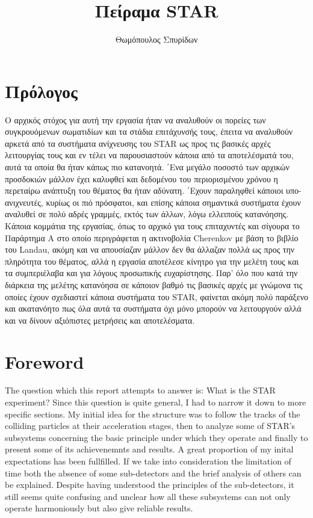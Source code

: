 \documentclass[a4paper,11pt]{book}
\title{Πείραμα 	STAR}
\author{Θωμόπουλος Σπυρίδων}
\begin{document}


\begin{changemargin}{2cm}{2cm} 
	\section*{Πρόλογος}
Ο αρχικός στόχος για αυτή την εργασία ήταν να αναλυθούν οι πορείες
των συγκρουόμενων σωματιδίων και τα στάδια επιτάχυνσής τους, έπειτα
να αναλυθούν αρκετά από τα συστήματα ανίχνευσης του STAR ως προς
τις βασικές αρχές λειτουργίας τους και εν τέλει να παρουσιαστούν κάποια
από τα αποτελέσματά του, αυτά τα οποία θα ήταν κάπως πιο κατανοητά.
΄Ενα μεγάλο ποσοστό των αρχικών προσδοκιών μάλλον έχει καλυφθεί και
δεδομένου του περιορισμένου χρόνου η περεταίρω ανάπτυξη του θέματος
θα ήταν αδύνατη. ΄Εχουν παραληφθεί κάποιοι υπο-ανιχνευτές, κυρίως οι
πιό πρόσφατοι, και επίσης κάποια σημαντικά συστήματα έχουν αναλυθεί
σε πολύ αδρές γραμμές, εκτός των άλλων, λόγω ελλειπούς κατανόησης.
Κάποια κομμάτια της εργασίας, όπως το αρχικό για τους επιταχυντές και
σίγουρα το Παράρτημα Α στο οποίο περιγράφεται η ακτινοβολία Cherenkov
με βάση το βιβλίο του Landau, ακόμη και να απουσίαζαν μάλλον δεν θα
άλλαζαν πολλά ως προς την πληρότητα του θέματος, αλλά η εργασία
αποτέλεσε κίνητρο για την μελέτη τους και τα συμπεριέλαβα και για λόγους προσωπικής ευχαρίστησης.
Παρ’ όλο που κατά την διάρκεια της μελέτης κατανόησα σε κάποιον βαθμό
τις βασικές αρχές με γνώμονα τις οποίες έχουν σχεδιαστεί κάποια συστήματα του STAR, φαίνεται ακόμη πολύ παράξενο και ακατανόητο πως όλα
αυτά τα συστήματα όχι μόνο μπορούν να λειτουργούν αλλά και να δίνουν
αξιόπιστες μετρήσεις και αποτελέσματα.

\section*{Foreword}
The question which this report attempts to answer is: What is the STAR experiment? Since this question is quite general, I had to narrow it down to more specific sections. My initial idea for the structure was to follow the tracks of the colliding particles at their acceleration stages, then to analyze some of STAR's subsystems concerning the basic principle under which they operate and finally to present some of its achievenemnts and results. 
	A great proportion of my inital expectations has been fullfilled. If we take into consideration the limitation of time both the absence of some sub-detectors and the brief analysis of others can be explained.
	 Despite having understood the principles of the sub-detectors, it still seems quite confusing and unclear how all these subsystems can not only operate harmoniously but also give reliable results. 
\end{changemargin} 
\end{document}

